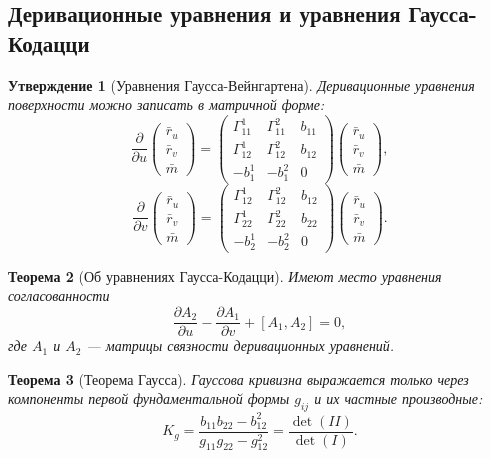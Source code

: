 \documentclass[12pt,a4paper]{article}
\newtheorem{theorem}{Теорема}[section]
\newtheorem{proposition}[theorem]{Утверждение}
\theoremstyle{definition}
\begin{document}
\subsection{Деривационные уравнения и уравнения Гаусса-Кодацци}

\begin{proposition}[Уравнения Гаусса-Вейнгартена]
Деривационные уравнения поверхности можно записать в матричной форме:
$$
\frac{\partial}{\partial u}
\begin{pmatrix}
\bar{r}_u\\
\bar{r}_v\\
\bar{m}
\end{pmatrix}
=
\begin{pmatrix}
\Gamma_{11}^1 & \Gamma_{11}^2 & b_{11}\\
\Gamma_{12}^1 & \Gamma_{12}^2 & b_{12}\\
-b_1^1 & -b_1^2 & 0
\end{pmatrix}
\begin{pmatrix}
\bar{r}_u\\
\bar{r}_v\\
\bar{m}
\end{pmatrix},
$$
$$
\frac{\partial}{\partial v}
\begin{pmatrix}
\bar{r}_u\\
\bar{r}_v\\
\bar{m}
\end{pmatrix}
=
\begin{pmatrix}
\Gamma_{12}^1 & \Gamma_{12}^2 & b_{12}\\
\Gamma_{22}^1 & \Gamma_{22}^2 & b_{22}\\
-b_2^1 & -b_2^2 & 0
\end{pmatrix}
\begin{pmatrix}
\bar{r}_u\\
\bar{r}_v\\
\bar{m}
\end{pmatrix}.
$$
\end{proposition}

\begin{theorem}[Об уравнениях Гаусса-Кодацци]
Имеют место уравнения согласованности
$$\frac{\partial A_2}{\partial u} - \frac{\partial A_1}{\partial v} + [A_1, A_2] = 0,$$
где $A_1$ и $A_2$ --- матрицы связности деривационных уравнений.
\end{theorem}

\begin{theorem}[Теорема Гаусса]
Гауссова кривизна выражается только через компоненты первой фундаментальной формы $g_{ij}$ и их частные производные:
$$K_g = \frac{b_{11}b_{22} - b_{12}^2}{g_{11}g_{22} - g_{12}^2} = \frac{\det(II)}{\det(I)}.$$
\end{theorem}
\end{document}
